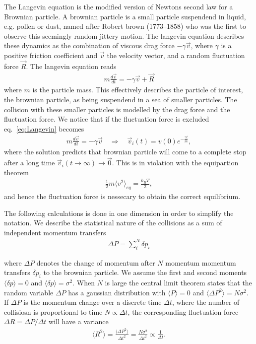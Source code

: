 The Langevin equation is the modified version of Newtons second law for a Brownian particle. A brownian particle is a small particle suspendend in liquid, e.g. pollen or dust, named after Robert brown (1773–1858) who was the first to observe this seemingly random jittery motion. The langevin equation describes these dynamics as the combination of viscous drag force $ -\gamma \vec{v}$, where $\gamma$ is a positive friction coefficient and $\vec{v}$ the velocity vector, and a random fluctuation force $\vec{R}$. The langevin equation reads
\begin{align}
  m \frac{d \vec{v}}{dt} = -\gamma \vec{v} + \vec{R}
  \label{eq:Langevin}
\end{align}
where $m$ is the particle mass. This effectively describes the particle of interest, the brownian particle, as being suspendend in a sea of smaller particles. The collision with these smaller particles is modelled by the drag force and the fluctuation force. We notice that if the fluctuation force is excluded eq.~\eqref{eq:Langevin} becomes 
\begin{align*}
  m \frac{d \vec{v}}{dt} = -\gamma \vec{v} \quad \Rightarrow \quad 
  \vec{v}_i(t) = v(0)e^{- \frac{\gamma t}{m}},
\end{align*}
where the solution predicts that brownian particle will come to a complete stop after a long time ${\vec{v}_i(t\to\infty) \to \vec{0}}$. This is in violation with the equipartion theorem
\begin{align*}
  \frac{1}{2}m\langle v^2 \rangle_{eq} = \frac{k_B T}{2},
\end{align*}
and hence the fluctuation force is nessecary to obtain the correct equilibrium. 

The following calculations is done in one dimension in order to simplify the notation. We describe the statistical nature of the collisions as a sum of independent momentum transfers
\begin{align*}
  \Delta P = \sum_i^N \delta p_i
\end{align*}

where $\Delta P$ denotes the change of momentum after $N$ momentum momentum transfers $\delta p_i$ to the brownian particle. We assume the first and second moments $\langle \delta p \rangle = 0$ and  $\langle \delta p \rangle = \sigma^2$. When $N$ is large the central limit theorem states that the random variable $\Delta P$ has a gaussian distribution with  $\langle P \rangle = 0$ and $\langle \Delta P^2 \rangle = N\sigma^2$. If $\Delta P$ is the momentum change over a discrete time $\Delta t$, where the number of collisiosn is proportional to time $N \propto \Delta t$, the corresponding fluctuation force $\Delta R = \Delta P / \Delta t$ will have a variance 
%
%
%
%
%
\begin{align*}
  \langle R^2 \rangle = \frac{\langle \Delta P^2 \rangle}{\Delta t^2} = \frac{N \sigma^2}{\Delta t^2}  \propto \frac{1}{\Delta t}.
\end{align*}

